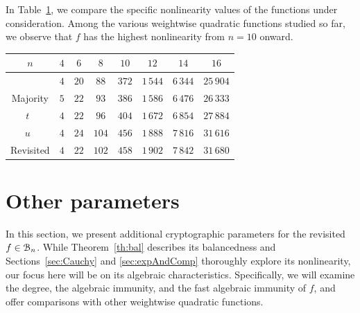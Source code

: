 \documentclass[11pt]{llncs}
\begin{document}
In Table~\ref{table:comparisonsNL}, we compare the specific nonlinearity values of the functions under consideration. Among the various weightwise quadratic functions studied so far, we observe that $f$ has the highest nonlinearity from $n=10$ onward.



\begin{table}
	\centering
	\begin{tabular}{|c| c|c|c|c| c|c|c|}
		\hline
		$n$ & $4$  & $6$  & $8$  &  $10$ & $12$ & $14$ & $16$  \\
	\hline	
    	\hwbf{}   & $4$  & $20$  & $88$  &  $372$ & $1\,544$ & $6\,344$ & $25\,904$  \\  	
		
Majority   & $5$  & $22$  & $93$  &  $386$ & $1\,586$ & $6\,476$ & $26\,333$  \\

    	$t$~\cite{DAM:MeaOza24}   & $4$  & $22$  & $96$  &  $404$ & $1\,672$ & $6\,854$ & $27\,884$\\

    	$u$~\cite{DAM:MeaOza24}   & $4$  & $24$  & $104$  &  $456$ & $1\,888$ & $7\,816$ & $31\,616$ \\
	
		
		Revisited \hwbf{}  & $4$  & $22$  & $102$  &  $458$ & $1\,902$ & $7\,842$ & $31\,680$\\
\hline
	\end{tabular}
	\label{table:comparisonsNL}
\end{table}





\section{Other parameters}\label{sec:otherParameters}

In this section, we present additional cryptographic parameters for the revisited \hwbf{} $f\in\mathcal{B}_n$. While Theorem~\ref{th:bal} describes its balancedness and Sections~\ref{sec:Cauchy} and \ref{sec:expAndComp} thoroughly explore its nonlinearity, our focus here will be on its algebraic characteristics. Specifically, we will examine the degree, the algebraic immunity, and the fast algebraic immunity of $f$, and offer comparisons with other weightwise quadratic functions.
\end{document}
